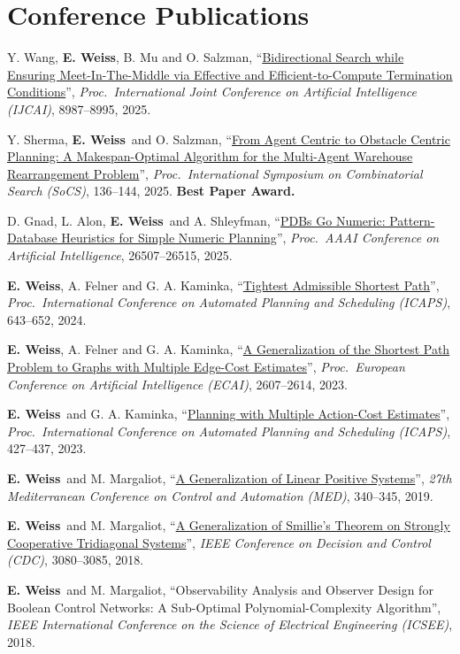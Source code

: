 \documentclass[10pt,letterpaper]{article}
\let\origsection\section
\renewcommand{\section}[1]{\Needspace*{5\baselineskip}\origsection{#1}}
\newcommand{\me}{\textbf{E. Weiss}}
\begin{document}
\section{Conference Publications}
\begin{pubs}
  \item Y. Wang, \me, B. Mu and O. Salzman, ``\href{https://doi.org/10.24963/ijcai.2025/999}{Bidirectional Search while Ensuring Meet-In-The-Middle via Effective and Efficient-to-Compute Termination Conditions}'', \emph{Proc.\ International Joint Conference on Artificial Intelligence (IJCAI)}, 8987--8995, 2025.
  \item Y. Sherma, \me\ and O. Salzman, ``\href{https://doi.org/10.1609/socs.v18i1.35985}{From Agent Centric to Obstacle Centric Planning: A Makespan-Optimal Algorithm for the Multi-Agent Warehouse Rearrangement Problem}'', \emph{Proc.\ International Symposium on Combinatorial Search (SoCS)}, 136--144, 2025. \textbf{Best Paper Award.}
  \item D. Gnad, L. Alon, \me\ and A. Shleyfman, ``\href{https://doi.org/10.1609/aaai.v39i25.34851}{PDBs Go Numeric: Pattern-Database Heuristics for Simple Numeric Planning}'', \emph{Proc.\ AAAI Conference on Artificial Intelligence}, 26507--26515, 2025.
  \item \me, A. Felner and G. A. Kaminka, ``\href{https://doi.org/10.1609/icaps.v34i1.31527}{Tightest Admissible Shortest Path}'', \emph{Proc.\ International Conference on Automated Planning and Scheduling (ICAPS)}, 643--652, 2024.
  \item \me, A. Felner and G. A. Kaminka, ``\href{https://doi.org/10.3233/FAIA230567}{A Generalization of the Shortest Path Problem to Graphs with Multiple Edge-Cost Estimates}'', \emph{Proc.\ European Conference on Artificial Intelligence (ECAI)}, 2607--2614, 2023.
  \item \me\ and G. A. Kaminka, ``\href{https://doi.org/10.1609/icaps.v33i1.27222}{Planning with Multiple Action-Cost Estimates}'', \emph{Proc.\ International Conference on Automated Planning and Scheduling (ICAPS)}, 427--437, 2023.
  \item \me\ and M. Margaliot, ``\href{https://doi.org/10.1109/MED.2019.8798547}{A Generalization of Linear Positive Systems}'', \emph{27th Mediterranean Conference on Control and Automation (MED)}, 340--345, 2019.
  \item \me\ and M. Margaliot, ``\href{https://doi.org/10.1109/CDC.2018.8619509}{A Generalization of Smillie's Theorem on Strongly Cooperative Tridiagonal Systems}'', \emph{IEEE Conference on Decision and Control (CDC)}, 3080--3085, 2018.
  \item \me\ and M. Margaliot, ``Observability Analysis and Observer Design for Boolean Control Networks: A Sub-Optimal Polynomial-Complexity Algorithm'', \emph{IEEE International Conference on the Science of Electrical Engineering (ICSEE)}, 2018.
\end{pubs}
\end{document}

